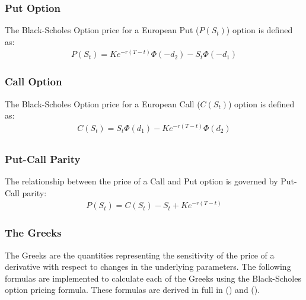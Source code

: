 \documentclass[10pt]{article}
\begin{document}
        \subsubsection{Put Option}

        The Black-Scholes Option price for a European Put ($P(S_t)$) option is defined as:
        \begin{gather*}
            P(S_t) = K e^{-r(T-t)} \Phi(-d_2) - S_t \Phi(-d_1)
        \end{gather*}

        


        \subsubsection{Call Option}

        The Black-Scholes Option price for a European Call ($C(S_t)$) option is defined as:
        \begin{gather*}
            C(S_t) = S_t \Phi(d_1) - K e^{-r(T-t)} \Phi(d_2) \\
        \end{gather*}

        


        \subsubsection{Put-Call Parity}

        The relationship between the price of a Call and Put option is governed by Put-Call parity:
        \begin{gather*}
            P(S_t) = C(S_t) - S_t + K e^{-r(T-t)}
        \end{gather*}
    
        


        \subsubsection{The Greeks} \label{sec:q2:greeks}

        The Greeks are the quantities representing the sensitivity of the price of a derivative with respect to changes in the underlying parameters. The following formulas are implemented to calculate each of the Greeks using the Black-Scholes option pricing formula. These formulas are derived in full in (\cite{Stefanica2011}) and (\cite{Weerawarana2016}).
\end{document}

